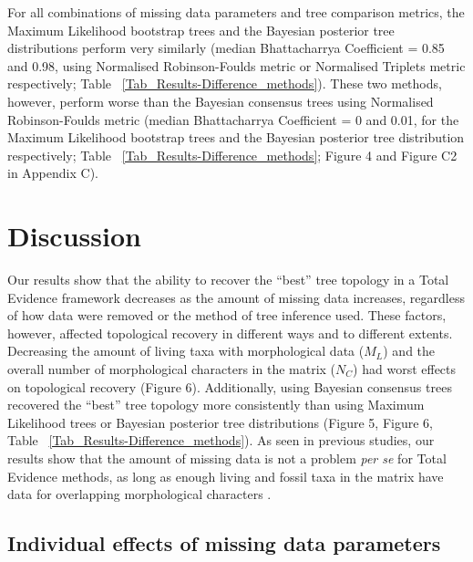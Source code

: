 \documentclass[12pt,letterpaper]{article}
\begin{document}
For all combinations of missing data parameters and tree comparison metrics, the Maximum Likelihood bootstrap trees and the Bayesian posterior tree distributions perform very similarly (median Bhattacharrya Coefficient = 0.85 and 0.98, using Normalised Robinson-Foulds metric or Normalised Triplets metric respectively; Table ~\ref{Tab_Results-Difference_methods}).
These two methods, however, perform worse than the Bayesian consensus trees using Normalised Robinson-Foulds metric (median Bhattacharrya Coefficient = 0 and 0.01, for the Maximum Likelihood bootstrap trees and the Bayesian posterior tree distribution respectively; Table ~\ref{Tab_Results-Difference_methods}; Figure 4 and Figure C2 in Appendix C).

%
%


\section{Discussion}

Our results show that the ability to recover the ``best'' tree topology in a Total Evidence framework decreases as the amount of missing data increases, regardless of how data were removed or the method of tree inference used.
These factors, however, affected topological recovery in different ways and to different extents.
Decreasing the amount of living taxa with morphological data ($M_{L}$) and the overall number of morphological characters in the matrix ($N_{C}$) had worst effects on topological recovery (Figure 6).
Additionally, using Bayesian consensus trees recovered the ``best'' tree topology more consistently than using Maximum Likelihood trees or Bayesian posterior tree distributions (Figure 5, Figure 6, Table ~\ref{Tab_Results-Difference_methods}).
As seen in previous studies, our results show that the amount of missing data is not a problem \textit{per se} for Total Evidence methods, as long as enough living and fossil taxa in the matrix have data for overlapping morphological characters \citep[e.g.][]{kearneyfragmentary2002,wiensmissing2003,rouresite-specific2011,pattinsonphylogeny2014}.

\subsection{Individual effects of missing data parameters}
\end{document}
